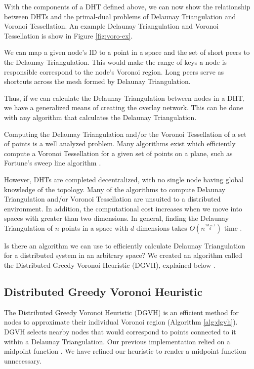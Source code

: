 With the components of a DHT defined above, we can now show the relationship between DHTs and the primal-dual problems of Delaunay Triangulation and Voronoi Tessellation.
An example Delaunay Triangulation and Voronoi Tessellation is show in Figure \ref{fig:voro-ex}.

We can map a given node's ID to a point in a space and the set of short peers to the Delaunay Triangulation.
This would make the range of keys a node is responsible correspond to the node's Voronoi region.
Long peers serve as shortcuts across the mesh formed by Delaunay Triangulation.


Thus, if we can calculate the Delaunay Triangulation between nodes in a DHT, we have a generalized means of creating the overlay network.
This can be done with any algorithm that calculates the Delaunay Triangulation.

Computing the Delaunay Triangulation and/or the Voronoi Tessellation of a set of points is a well analyzed problem.
Many algorithms exist which efficiently compute a Voronoi Tessellation for a given set of points on a plane, such as Fortune's sweep line algorithm \cite{fortune1987sweepline}.

However, DHTs are completed decentralized, with no single node having global knowledge of the topology.
Many of the algorithms to compute Delaunay Triangulation and/or Voronoi Tessellation are unsuited to a distributed environment.
In addition, the computational cost increases when we move into spaces with greater than two dimensions.
In general, finding the Delaunay Triangulation of $n$ points in a space with $d$ dimensions takes $O(n^{\frac{2d-1}{d}})$ time \cite{watson1981computing}.


Is there an algorithm we can use to efficiently calculate Delaunay Triangulation for a distributed system in an arbitrary space?
We created an algorithm called the Distributed Greedy Voronoi Heuristic (DGVH), explained below \cite{dgvh}.


\subsection{Distributed Greedy Voronoi Heuristic}
\label{sec:dgvh}


The Distributed Greedy Voronoi Heuristic (DGVH) is an efficient method for nodes to approximate their individual Voronoi region (Algorithm \ref{alg:dgvh}). 
DGVH selects nearby nodes that would correspond to points connected to it within a Delaunay Triangulation.
Our previous implementation relied on a midpoint function \cite{dgvh}.
We have refined our heuristic to render a midpoint function unnecessary.


